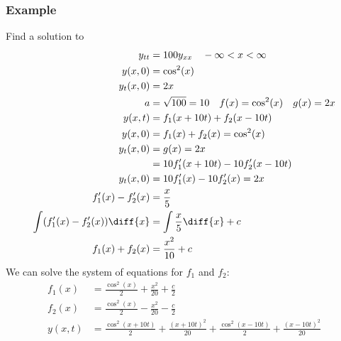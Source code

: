 \documentclass{math}
\begin{document}
\subsubsection*{Example}
Find a solution to
\begin{align*}
  y_{tt} &= 100y_{xx} \quad -\infty<x<\infty \\
  y(x,0) &= \cos^2(x) \\
  y_t(x,0) &= 2x \\
  a &= \sqrt{100} = 10 \quad f(x) = \cos^2(x) \quad g(x) = 2x \\
  y(x,t) &= f_1(x+10t)+f_2(x-10t) \\
  y(x,0) &= f_1(x)+f_2(x) = \cos^2(x) \\
  y_t(x,0) &= g(x) = 2x \\
  &= 10f_1'(x+10t)-10f_2'(x-10t) \\
  y_t(x,0) &= 10f_1'(x)-10f_2'(x) = 2x \\
  f_1'(x)-f_2'(x) &= \frac{x}{5} \\
  \int(f_1'(x)-f_2'(x))\diff{x} &= \int\frac{x}{5}\diff{x}+c \\
  f_1(x)+f_2(x) &= \frac{x^2}{10}+c
\end{align*}
We can solve the system of equations for \( f_1 \) and \( f_2 \):
\begin{align*}
  f_1(x) &= \frac{\cos^2(x)}{2}+\frac{x^2}{20}+\frac{c}{2} \\
  f_2(x) &= \frac{\cos^2(x)}{2}-\frac{x^2}{20}-\frac{c}{2} \\
  y(x,t) &= \frac{\cos^2(x+10t)}{2}+\frac{(x+10t)^2}{20}+
    \frac{\cos^2(x-10t)}{2}+\frac{(x-10t)^2}{20}
\end{align*}
\end{document}
